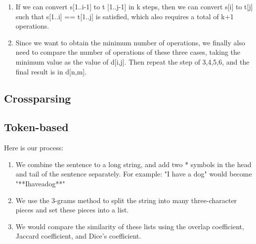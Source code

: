 \documentclass[]{article}
\begin{document}
\begin{enumerate}
\begin{enumerate}
        \item If we can convert s[1..i-1] to t [1..j-1] in k steps, then we can convert s[i] to t[j] such that s[1..i] == t[1..j] is satisfied, which also requires a total of k+1 operations. 

        \item Since we want to obtain the minimum number of operations, we finally also need to compare the number of operations of these three cases, taking the minimum value as the value of d[i,j]. Then repeat the step of 3,4,5,6, and the final result is in d[n,m].
    \end{enumerate}
\end{enumerate}



\subsection{Crossparsing}



\subsection{Token-based}
Here is our process:
\begin{enumerate}
    \item We combine the sentence to a long string, and add two * symbols in the head and tail of the sentence separately.
    For example: "I have a dog" would become "**Ihaveadog**"

    \item We use the 3-grams method to split the string into many three-character pieces and set these pieces into a list.

    \item We would compare the similarity of these lists using the overlap coefficient, Jaccard coefficient, and Dice's coefficient.
    
\end{enumerate}
\end{document}

